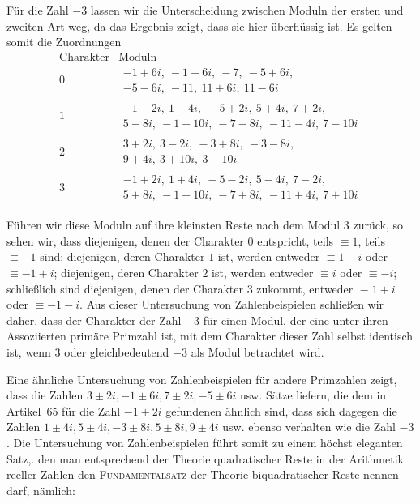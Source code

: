 Für die Zahl $-3$ lassen wir die Unterscheidung zwischen Moduln der ersten und zweiten Art weg, da das Ergebnis zeigt, dass sie hier überflüssig ist. Es gelten somit die Zuordnungen
%
\[
\begin{array}{c|l}
\text{Charakter}&\text{Moduln}\\\hline
0&\begin{gathered}-1+6i,\ -1-6i,\ -7,\ -5+6i,\\-5-6i,\ -11,\ 11+6i,\ 11-6i\end{gathered}\\[3pt]
1&\begin{gathered}-1-2i,\ 1-4i,\ -5+2i,\ 5+4i,\ 7+2i,\\5-8i,\ -1+10i,\ -7-8i,\ -11-4i,\ 7-10i\end{gathered}\\[3pt]
2&\begin{gathered}3+2i,\ 3-2i,\ -3+8i,\ -3-8i,\\9+4i,\ 3+10i,\ 3-10i\end{gathered}\\[3pt]
3&\begin{gathered}-1+2i,\ 1+4i,\ -5-2i,\ 5-4i,\ 7-2i,\\5+8i,\ -1-10i,\ -7+8i,\ -11+4i,\ 7+10i\end{gathered}
\end{array}
\]

Führen wir diese Moduln auf ihre kleinsten Reste nach dem Modul $3$ zurück, so sehen wir, dass diejenigen, denen der Charakter $0$ entspricht, teils $\equiv1$, teils $\equiv-1$ sind; diejenigen, deren Charakter $1$ ist, werden entweder $\equiv1-i$ oder $\equiv-1+i$; diejenigen, deren Charakter $2$ ist, werden entweder $\equiv i$ oder $\equiv-i$; schließlich sind diejenigen, denen der Charakter $3$ zukommt, entweder $\equiv1+i$ oder $\equiv-1-i$. Aus dieser Untersuchung von Zahlenbeispielen schließen wir daher, dass der Charakter der Zahl $-3$ für einen Modul, der eine unter ihren Assoziierten primäre Primzahl ist, mit dem Charakter dieser Zahl selbst identisch ist, wenn $3$ oder gleichbedeutend $-3$ als Modul betrachtet wird.

\newpage
{}
Eine ähnliche Untersuchung von Zahlenbeispielen für andere Primzahlen zeigt, dass die Zahlen $3\pm2i,-1\pm6i,7\pm2i,-5\pm6i$ usw. Sätze liefern, die dem in Artikel~65 für die Zahl $-1+2i$ gefundenen ähnlich sind, dass sich dagegen die Zahlen $1\pm4i,5\pm4i,-3\pm8i,5\pm8i,9\pm4i$ usw. ebenso verhalten wie die Zahl $-3$. Die Untersuchung von Zahlenbeispielen führt somit zu einem höchst eleganten Satz,. den man entsprechend der Theorie quadratischer Reste in der Arithmetik reeller Zahlen den \textsc{Fundamentalsatz} der Theorie biquadratischer Reste nennen darf, nämlich:

